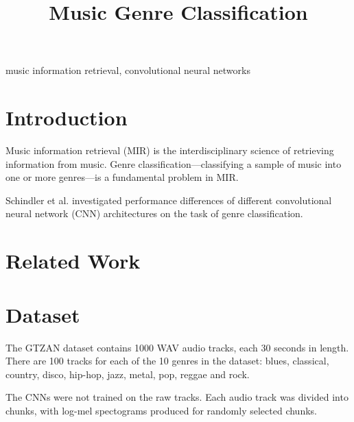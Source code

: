 \documentclass[conference]{IEEEtran}
\begin{document}
\title{Music Genre Classification}

\author{
}

\maketitle

\begin{abstract}
\end{abstract}

\begin{IEEEkeywords}
music information retrieval, convolutional neural networks
\end{IEEEkeywords}

\section{Introduction}

Music information retrieval (MIR) is the interdisciplinary science of retrieving information from music.
Genre classification---classifying a sample of music into one or more genres---is a fundamental problem in MIR.

Schindler et al. \cite{SchindlerLidyRauber} investigated performance differences of different convolutional neural network (CNN) architectures on the task of genre classification.


\section{Related Work}

\section{Dataset}

The GTZAN dataset \cite{TzanetakisEsslCook} contains 1000 WAV audio tracks, each 30 seconds in length.
There are 100 tracks for each of the 10 genres in the dataset: blues, classical, country, disco, hip-hop, jazz, metal, pop, reggae and rock.

The CNNs were not trained on the raw tracks.
Each audio track was divided into chunks, with log-mel spectograms produced for randomly selected chunks.
\end{document}
